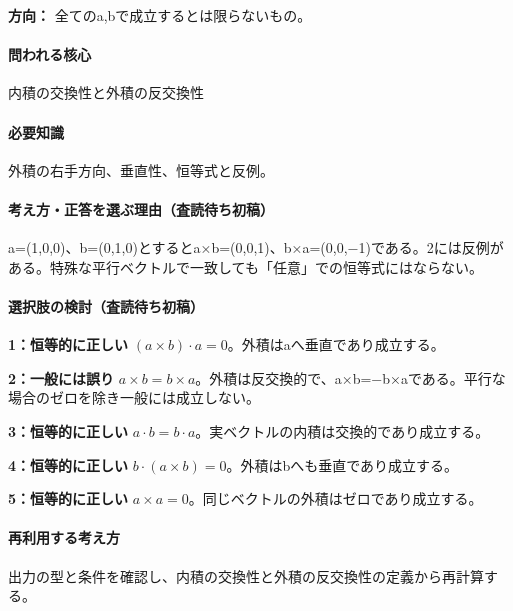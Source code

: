 \noindent\textbf{方向：} 全てのa,bで成立するとは限らないもの。\par

\paragraph{問われる核心} 内積の交換性と外積の反交換性

\paragraph{必要知識} 外積の右手方向、垂直性、恒等式と反例。

\paragraph{考え方・正答を選ぶ理由（査読待ち初稿）} a=\allowbreak{}(1,0,0)、b=\allowbreak{}(0,1,0)とするとa×b=\allowbreak{}(0,0,1)、b×a=\allowbreak{}(0,0,−1)である。2には反例がある。特殊な平行ベクトルで一致しても「任意」での恒等式にはならない。

\paragraph{選択肢の検討（査読待ち初稿）}\mbox{}\par

\noindent\textbf{1：恒等的に正しい} \((a\times b)\cdot a=0\)。外積はaへ垂直であり成立する。\par

\noindent\textbf{2：一般には誤り} \(a\times b=b\times a\)。外積は反交換的で、a×b=−b×aである。平行な場合のゼロを除き一般には成立しない。\par

\noindent\textbf{3：恒等的に正しい} \(a\cdot b=b\cdot a\)。実ベクトルの内積は交換的であり成立する。\par

\noindent\textbf{4：恒等的に正しい} \(b\cdot(a\times b)=0\)。外積はbへも垂直であり成立する。\par

\noindent\textbf{5：恒等的に正しい} \(a\times a=0\)。同じベクトルの外積はゼロであり成立する。\par

\paragraph{再利用する考え方} 出力の型と条件を確認し、内積の交換性と外積の反交換性の定義から再計算する。


